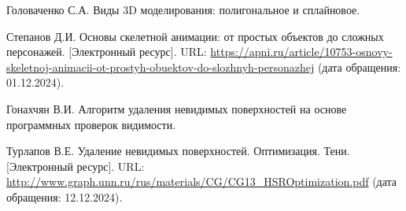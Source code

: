 \begin{thebibliography}{99}

   Головаченко С.А. Виды 3D моделирования: полигональное и сплайновое. 

   Степанов Д.И. Основы скелетной анимации: от простых объектов до сложных персонажей. [Электронный ресурс]. URL: \url{https://apni.ru/article/10753-osnovy-skeletnoj-animacii-ot-prostyh-obuektov-do-slozhnyh-personazhej} (дата обращения: 01.12.2024).

   Гонахчян В.И. Алгоритм удаления невидимых поверхностей на основе программных проверок видимости.

   Турлапов В.Е. Удаление невидимых поверхностей. Оптимизация. Тени. [Электронный ресурс]. URL: \url{http://www.graph.unn.ru/rus/materials/CG/CG13_HSROptimization.pdf} (дата обращения: 12.12.2024).

\end{thebibliography}